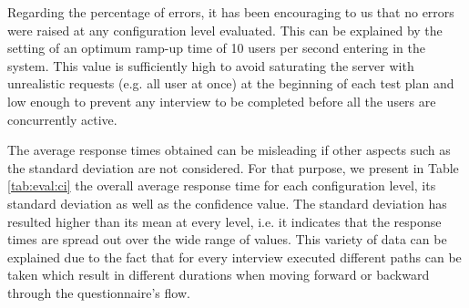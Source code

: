 	Regarding the percentage of errors, it has been encouraging to us that no errors were raised at any configuration level evaluated. This can be explained by the setting of an optimum ramp-up time of 10 users per second entering in the system. This value is sufficiently high to avoid saturating the server with unrealistic requests (e.g. all user at once) at the beginning of each test plan and low enough to prevent any interview to be completed before all the users are concurrently active.


	

	The average response times obtained can be misleading if other aspects such as the standard deviation are not considered. For that purpose, we present in Table \ref{tab:eval:ci} the overall average response time for each configuration level, its standard deviation as well as the confidence value. The standard deviation has resulted higher than its mean at every level, i.e. it indicates that the response times are spread out over the wide range of values. This variety of data can be explained due to the fact that for every interview executed different paths can be taken which result in different durations when moving forward or backward through the questionnaire's flow.

